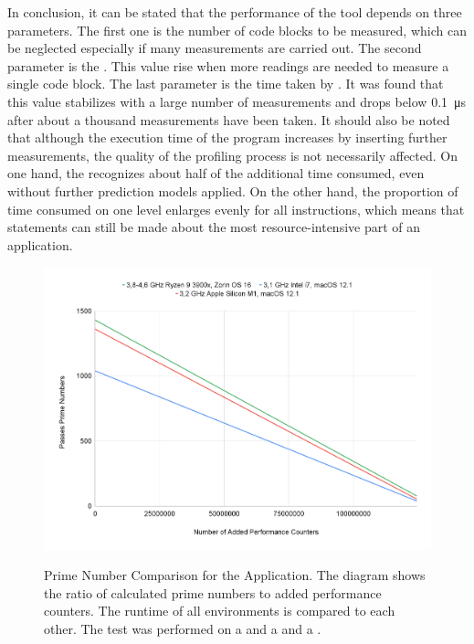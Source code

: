 In conclusion, it can be stated that the performance of the tool depends on three parameters. The first one is the number of code blocks to be measured, which can be neglected especially if many measurements are carried out. The second parameter is the \TOTALCODEBLOCK. This value rise when more readings are needed to measure a single code block. The last parameter is the time taken by \MEASUREVALUE. It was found that this value stabilizes with a large number of measurements and drops below \SI{0.1}{\micro\second} after about a thousand measurements have been taken. It should also be noted that although the execution time of the program increases by inserting further measurements, the quality of the profiling process is not necessarily affected. On one hand, the \TOOL recognizes about half of the additional time consumed, even without further prediction models applied. On the other hand, the proportion of time consumed on one level enlarges evenly for all instructions, which means that statements can still be made about the most resource-intensive part of an application.  

\begin{figure}[t]
  \centering
  \caption[Prime Number Comparison for the \PRIME Application.]{Prime Number Comparison for the \PRIME Application. The diagram shows the ratio of calculated prime numbers to added performance counters. The runtime of all environments is compared to each other. The test was performed on a \IMAC and a \MACBOOK and a \AMD.} 
  \includegraphics[width=1\textwidth]{graphics/e_prime_comparison.png}
  \label{fig:e:prime_comparison}
\end{figure}


